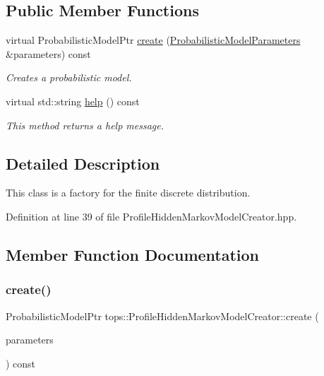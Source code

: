 \subsection*{Public Member Functions}
\begin{DoxyCompactItemize}
\item 
virtual Probabilistic\+Model\+Ptr \hyperlink{classtops_1_1ProfileHiddenMarkovModelCreator_ac6787c8bf7b790c566ee01f4f0c67744}{create} (\hyperlink{classtops_1_1ProbabilisticModelParameters}{Probabilistic\+Model\+Parameters} \&parameters) const
\begin{DoxyCompactList}\small\item\em Creates a probabilistic model. \end{DoxyCompactList}\item 
\mbox{\label{classtops_1_1ProfileHiddenMarkovModelCreator_afba1445cb46e25d3e52c06a0746fa7ce}} 
virtual std\+::string \hyperlink{classtops_1_1ProfileHiddenMarkovModelCreator_afba1445cb46e25d3e52c06a0746fa7ce}{help} () const
\begin{DoxyCompactList}\small\item\em This method returns a help message. \end{DoxyCompactList}\end{DoxyCompactItemize}


\subsection{Detailed Description}
This class is a factory for the finite discrete distribution. 

Definition at line 39 of file Profile\+Hidden\+Markov\+Model\+Creator.\+hpp.



\subsection{Member Function Documentation}
\mbox{\label{classtops_1_1ProfileHiddenMarkovModelCreator_ac6787c8bf7b790c566ee01f4f0c67744}} 
\subsubsection{\texorpdfstring{create()}{create()}}
{\footnotesize\ttfamily Probabilistic\+Model\+Ptr tops\+::\+Profile\+Hidden\+Markov\+Model\+Creator\+::create (\begin{DoxyParamCaption}\item[{\hyperlink{classtops_1_1ProbabilisticModelParameters}{Probabilistic\+Model\+Parameters} \&}]{parameters }\end{DoxyParamCaption}) const\hspace{0.3cm}{\ttfamily [virtual]}}



